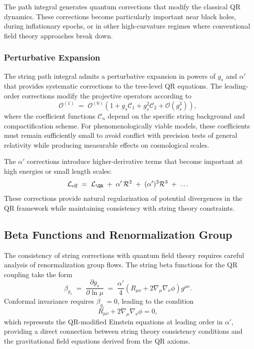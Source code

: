 The path integral generates quantum corrections that modify the classical QR dynamics. These corrections become particularly important near black holes, during inflationary epochs, or in other high-curvature regimes where conventional field theory approaches break down.

\subsubsection{Perturbative Expansion}
\label{subsubsec:perturbative-expansion}

The string path integral admits a perturbative expansion in powers of $g_s$ and $\alpha'$ that provides systematic corrections to the tree-level QR equations. The leading-order corrections modify the projective operators according to
\begin{equation}
\mathcal{O}^{(1)} \;=\; \mathcal{O}^{(0)} \left(1 + g_s \mathcal{C}_1 + g_s^2 \mathcal{C}_2 + \mathcal{O}(g_s^3)\right),
\label{eq:perturbative-expansion}
\end{equation}
where the coefficient functions $\mathcal{C}_n$ depend on the specific string background and compactification scheme. For phenomenologically viable models, these coefficients must remain sufficiently small to avoid conflict with precision tests of general relativity while producing measurable effects on cosmological scales.

The $\alpha'$ corrections introduce higher-derivative terms that become important at high energies or small length scales:
\begin{equation}
\mathcal{L}_{\text{eff}} \;=\; \mathcal{L}_{\QR} \;+\; \alpha'\,\mathcal{R}^2 \;+\; (\alpha')^2 \mathcal{R}^3 \;+\; \ldots
\label{eq:alpha-prime-corrections}
\end{equation}
These corrections provide natural regularization of potential divergences in the QR framework while maintaining consistency with string theory constraints.

\subsection{Beta Functions and Renormalization Group}
\label{subsec:beta-functions}

The consistency of string corrections with quantum field theory requires careful analysis of renormalization group flows. The string beta functions for the QR coupling take the form
\begin{equation}
\beta_{g_s} \;=\; \frac{\partial g_s}{\partial \ln \mu} \;=\; \frac{\alpha'}{4} \left( R_{\mu\nu} + 2\nabla_\mu \nabla_\nu \phi \right) g^{\mu\nu}.
\label{eq:string-beta-function}
\end{equation}
Conformal invariance requires $\beta_{g_s} = 0$, leading to the condition
\begin{equation}
R_{\mu\nu} + 2\nabla_\mu \nabla_\nu \phi = 0,
\label{eq:conformal-condition}
\end{equation}
which represents the QR-modified Einstein equations at leading order in $\alpha'$, providing a direct connection between string theory consistency conditions and the gravitational field equations derived from the QR axioms.

